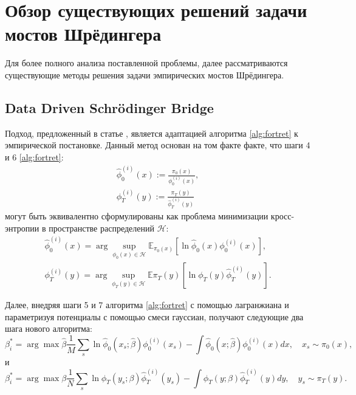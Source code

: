 \section{Обзор существующих решений задачи мостов Шрёдингера}
\label{sec:Chapter3} 

Для более полного анализа поставленной проблемы, далее рассматриваются существующие методы решения задачи эмпирических мостов Шрёдингера.

\subsection{Data Driven Schrödinger Bridge}
Подход, предложенный в статье \cite{pavon-empiric-fortret}, является адаптацией алгоритма \ref{alg:fortret} к эмпирической постановке. Данный метод основан на том факте факте, что шаги 4 и 6 \ref{alg:fortret}:
\begin{equation*}
    \begin{split}
    \hat{\phi}^{(i)}_0(x) := \frac{\pi_0(x)}{\phi^{(i)}_0(x)}, \\
    \phi^{(i)}_T(y) := \frac{\pi_T(y)}{\hat{\phi}^{(i)}_T(y)}
    \end{split}
\end{equation*}
могут быть эквивалентно сформулированы как проблема минимизации кросс-энтропии в пространстве распределений $\mathcal{H}$:
\begin{equation*}
    \begin{split}
        \hat{\phi}^{(i)}_0(x) = \arg \sup_{\phi_0(x) \in \mathcal{H}} \mathbb{E}_{\pi_0(x)} \left[ \ln \hat{\phi}_0(x) \phi^{(i)}_0(x) \right],\\
        \phi^{(i)}_T(y) = \arg \sup_{\phi_T(y) \in \mathcal{H}} \mathbb{E}{\pi_T(y)} \left[ \ln \phi_T(y) \hat{\phi}^{(i)}_T(y) \right].
    \end{split}
\end{equation*}

Далее, внедряя шаги 5 и 7 алгоритма \ref{alg:fortret} с помощью лагранжиана и параметризуя потенциалы с помощью смеси гауссиан, получают следующие два шага нового алгоритма:
\begin{equation*}
    \beta^{*}_i = \arg \max{\hat{\beta}} \frac{1}{M} \sum_{s} \ln \hat{\phi}_0(x_s; \hat{\beta}) \phi^{(i)}_0(x_s) - \int \hat{\phi}_0(x; \hat{\beta}) \phi^{(i)}_0(x) dx, \quad x_s \sim \pi_0(x),
\end{equation*}
и
\begin{equation*}
    \beta^{*}_i = \arg \max{\beta} \frac{1}{N} \sum_{s} \ln \phi_T(y_s; \beta) \hat{\phi}^{(i)}_T(y_s) - \int \phi_T(y; \beta) \hat{\phi}^{(i)}_T(y) dy, \quad y_s \sim \pi_T(y).
\end{equation*}

